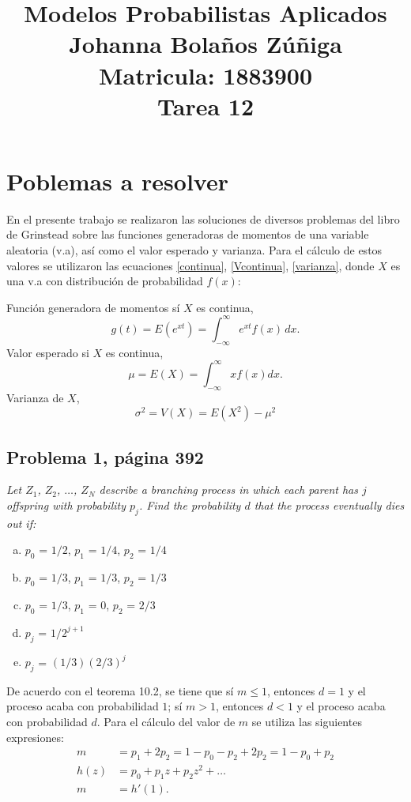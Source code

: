 \documentclass{article}
\title{
\centering
Modelos Probabilistas Aplicados \\
Johanna Bolaños Zúñiga \\
Matricula: 1883900\\
Tarea 12
}
\date{}
\begin{document}
\maketitle

\section{Poblemas a resolver}

En el presente trabajo se realizaron las soluciones de diversos problemas del libro de Grinstead \cite{librop} sobre las funciones generadoras de momentos de una variable aleatoria (v.a), así como el valor esperado y varianza. Para el cálculo de estos valores se utilizaron las ecuaciones \ref{continua}, \ref{Vcontinua}, \ref{varianza}, donde $X$ es una v.a con distribución de probabilidad $f{(x)}$:

\noindent Función generadora de momentos sí $X$ es continua,
\begin{equation}
g{(t)} = E{(e^{xt})} = \int_{-\infty}^{\infty}e^{xt}f(x)\,dx.
\label{continua}
\end{equation}
\noindent Valor esperado si $X$ es continua,
\begin{equation}
\mu = E{(X)} = \int_{-\infty}^{\infty}xf(x)dx.
\label{Vcontinua}
\end{equation}
\noindent Varianza de $X$,
\begin{equation}
\sigma^2 = V(X)= E{(X^2)} - \mu^2
\label{varianza}
\end{equation}

\subsection{Problema 1, página 392}
\noindent \textit{Let $Z_{1}$, $Z_{2}$, $\dots$, $Z_{N}$ describe a branching process in which each parent has $j$ offspring with probability $p_{j}$. Find the probability $d$ that the process eventually dies out if:}

\begin{enumerate}[a)]
    \item $p_{0}$ = $1/2$, $p_{1}$ = $1/4$, $p_{2}$ = $1/4$
    \item $p_{0}$ = $1/3$, $p_{1}$ = $1/3$, $p_{2}$ = $1/3$
    \item $p_{0}$ = $1/3$, $p_{1}$ = $0$, $p_{2}$ = $2/3$
    \item $p_{j}$ = $1/2^{j+1}$
    \item $p_{j}$ = $(1/3)(2/3)^j$
\end{enumerate}  
De acuerdo con el teorema 10.2, se tiene que sí $m \leq 1$, entonces $d=1$ y el proceso acaba con probabilidad $1$; sí $m > 1$, entonces $d < 1$ y el proceso acaba con probabilidad $d$. Para el cálculo del valor de $m$ se utiliza las siguientes expresiones:
\begin{align}
    \nonumber
    m & = p_{1}+2p_{2} = 1-p_{0}-p_{2}+2p_{2} = 1-p_{0}+p_{2} \\ \nonumber
    h(z) & = p_{0} + p_{1}z + p_{2}z^2 + \dots \\ \nonumber
    m & = h'(1). \nonumber
\end{align}
\end{document}
